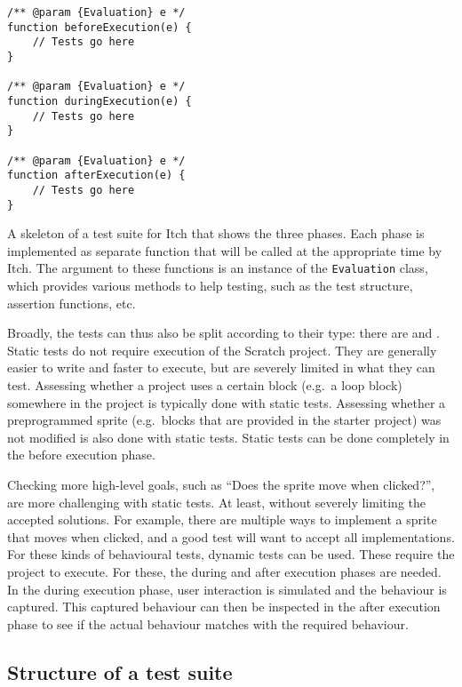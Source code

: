 \documentclass[../main]{subfiles}
\begin{document}
\begin{listing}
    \begin{verbatim}
/** @param {Evaluation} e */
function beforeExecution(e) {
    // Tests go here
}

/** @param {Evaluation} e */
function duringExecution(e) {
    // Tests go here
}

/** @param {Evaluation} e */
function afterExecution(e) {
    // Tests go here
}
    \end{verbatim}
    \caption[]{
        A skeleton of a test suite for Itch that shows the three phases.
        Each phase is implemented as separate function that will be called at the appropriate time by Itch.
        The argument to these functions is an instance of the \texttt{Evaluation} class, which provides various methods to help testing, such as the test structure, assertion functions, etc.
    }
    \label{lst:itch-test-suite-skeleton}
\end{listing}

Broadly, the tests can thus also be split according to their type: there are  and .
Static tests do not require execution of the Scratch project.
They are generally easier to write and faster to execute, but are severely limited in what they can test.
Assessing whether a project uses a certain block (e.g.\ a loop block) somewhere in the project is typically done with static tests.
Assessing whether a preprogrammed sprite (e.g.\ blocks that are provided in the starter project) was not modified is also done with static tests.
Static tests can be done completely in the before execution phase.

Checking more high-level goals, such as ``Does the sprite move when clicked?'', are more challenging with static tests.
At least, without severely limiting the accepted solutions.
For example, there are multiple ways to implement a sprite that moves when clicked, and a good test will want to accept all implementations.
For these kinds of behavioural tests, dynamic tests can be used.
These require the project to execute.
For these, the during and after execution phases are needed.
In the during execution phase, user interaction is simulated and the behaviour is captured.
This captured behaviour can then be inspected in the after execution phase to see if the actual behaviour matches with the required behaviour.

\subsection{Structure of a test suite}\label{subsec:structure-of-a-test-suite2}
\end{document}
